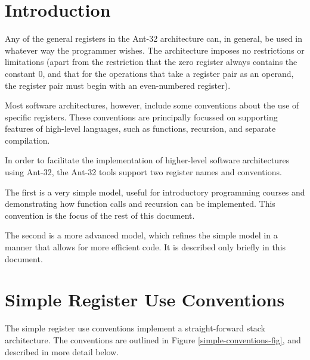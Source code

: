 
\section{Introduction}

Any of the general registers in the Ant-32 architecture can, in
general, be used in whatever way the programmer wishes.  The
architecture imposes no restrictions or limitations (apart from the
restriction that the zero register always contains the constant 0, and
that for the operations that take a register pair as an operand, the
register pair must begin with an even-numbered register).

Most software architectures, however, include some conventions about
the use of specific registers.  These conventions are principally
focussed on supporting features of high-level languages, such as
functions, recursion, and separate compilation.

In order to facilitate the implementation of higher-level software
architectures using Ant-32, the Ant-32 tools support two register
names and conventions.

The first is a very simple model, useful for introductory programming
courses and demonstrating how function calls and recursion can be
implemented.  This convention is the focus of the rest of this document.

The second is a more advanced model, which refines the simple model in
a manner that allows for more efficient code.  It is described only
briefly in this document.

\section{Simple Register Use Conventions}

The simple register use conventions implement a straight-forward stack
architecture.  The conventions are outlined in Figure
\ref{simple-conventions-fig}, and described in more detail below.

